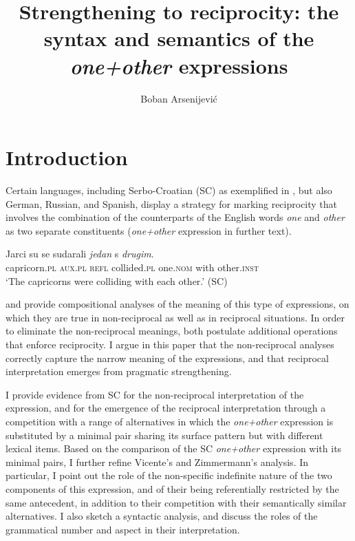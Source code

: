 \documentclass[output=paper,colorlinks,citecolor=brown]{langscibook}
\author{Boban Arsenijević\affiliation{University of Graz}\orcid{0000-0002-1124-6319}}
\title{Strengthening to reciprocity: the syntax and semantics of the \textit{one+other} expressions}
\begin{document}
\maketitle

%

\section{Introduction}\label{sec:intro}

Certain languages, including Serbo-Croatian (SC) as exemplified in , but also German, Russian, and Spanish, display a strategy for marking reciprocity that involves the combination of the counterparts of the English words \textit{one} and \textit{other} as two separate constituents (\textit{one+other} expression in further text).

\ea\label{ex:Jarci}
\gll Jarci su se sudarali \textit{jedan} s \textit{drugim}. \\
capricorn.\textsc{pl} \textsc{aux.pl} \textsc{refl} collided.\textsc{pl} 
one.\textsc{nom} with other.\textsc{inst}\\
\glt`The capricorns were colliding with each other.' \hfill (SC) 
\z

\noindent \citet{v10} and \citet{z14} provide compositional analyses of the meaning of this type of expressions, on which they are true in non-reciprocal as well as in reciprocal situations. In order to eliminate the non-reciprocal meanings, both postulate additional operations that enforce reciprocity. I argue in this paper that the non-reciprocal analyses correctly capture the narrow meaning of the expressions, and that reciprocal interpretation emerges from pragmatic strengthening.

I provide evidence from SC for the non-reciprocal interpretation of the expression, and for the emergence of the reciprocal interpretation through a competition with a range of alternatives in which the \textit{one+other} expression is substituted by a minimal pair sharing its surface pattern but with different lexical items. Based on the comparison of the SC \textit{one+other} expression with its minimal pairs, I further refine Vicente's and Zimmermann's analysis. In particular, I point out the role of the non-specific indefinite nature of the two components of this expression, and of their being referentially restricted by the same antecedent, in addition to their competition with their semantically similar alternatives. I also sketch a syntactic analysis, and discuss the roles of the grammatical number and aspect in their interpretation.
\end{document}
